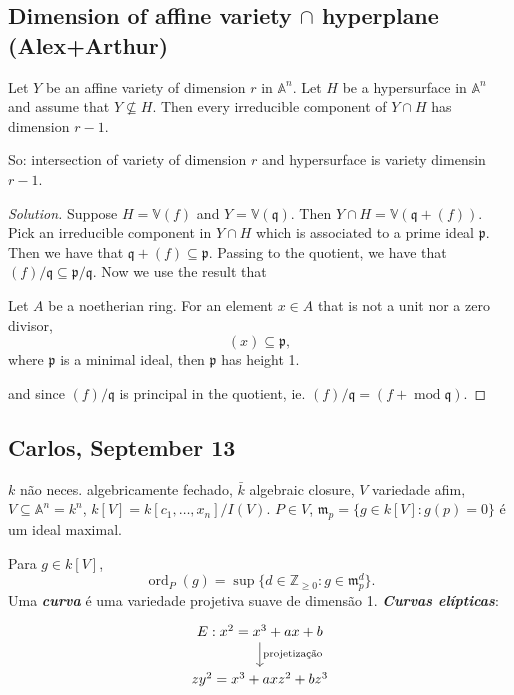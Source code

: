 \subsection{Dimension of affine variety $\cap$ hyperplane (Alex+Arthur)}

\begin{manualexercise}{1.8}
	Let $Y$ be an affine variety of dimension $r$ in $\mathbb{A}^n$. Let $H$ be a hypersurface in $\mathbb{A}^n$ and assume that $ Y\not\subseteq H$. Then every irreducible component of $Y\cap H$ has dimension $r-1$.

	So: intersection of variety of dimension $r$ and hypersurface is variety dimensin $r-1$.
\end{manualexercise}

\begin{proof}[Solution]\leavevmode
	Suppose $H=\mathbb{V}(f)$ and $Y=\mathbb{V}(\mathfrak{q})$. Then $Y\cap H=\mathbb{V}(\mathfrak{q}+(f))$. Pick an irreducible component in $Y\cap H$ which is associated to a prime ideal $\mathfrak{p}$. Then we have that $\mathfrak{q}+(f)\subseteq \mathfrak{p}$. Passing to the quotient, we have that $(f)/\mathfrak{q}\subseteq \mathfrak{p}/\mathfrak{q}$. Now we use the result that

	\begin{thm}
		Let $A$ be a noetherian ring. For an element $x\in A$ that is not a unit nor a zero divisor,
		\[(x)\subseteq \mathfrak{p},\]
		where $\mathfrak{p}$ is a minimal ideal, then $\mathfrak{p}$ has height 1.
	\end{thm}
and since $(f)/\mathfrak{q}$ is principal in the quotient, ie. $(f)/\mathfrak{q}=(f+\operatorname{mod}\mathfrak{q})$.
\end{proof}

\subsection{Carlos, September 13}

$k$ n\~ao neces. algebricamente fechado, $\bar{k}$ algebraic closure, $V$ variedade afim, $V\subseteq \mathbb{A}^n=k^n$, $k[V]=k[c_1,\ldots,x_n]/I(V)$. $P\in V$, $\mathfrak{m}_p=\{g\in k[V]:g(p)=0\}$ \'e um ideal maximal.

Para $g\in k[V]$,
\[\operatorname{ord}_P(g)=\operatorname{sup}\{d\in\mathbb{Z}_{\geq 0}:g\in\mathfrak{m}_p^d\}.\]
Uma \textit{\textbf{curva}} \'e uma variedade projetiva suave de dimens\~ao 1. \textit{\textbf{Curvas el\'ipticas}}:
\[\begin{tikzcd}
	E:x^2=x^3+ax+b\arrow[d,"\text{projetiza\c c\~ao}" ]\\
	zy^2=x^3+axz^2+bz^3
\end{tikzcd}\]

